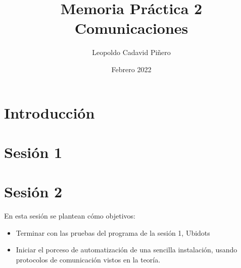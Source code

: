\documentclass[12pt, a4paper]{article}
\title{Memoria Práctica 2 \\


\large Comunicaciones
}
\author{
Leopoldo Cadavid Piñero
}
\date{Febrero 2022}
\begin{document}
\maketitle
\newpage
\tableofcontents
\newpage
\section{Introducción}
      

\section{Sesión 1}

\section{Sesión 2}
 En esta sesión se plantean cómo objetivos:
 \begin{itemize}
     \item Terminar con las pruebas del programa de la sesión 1, Ubidots
     \item Iniciar el porceso de automatización de una sencilla instalación, usando protocolos de 
    comunicación vistos en la teoría.
    \end{itemize}
\end{document}
